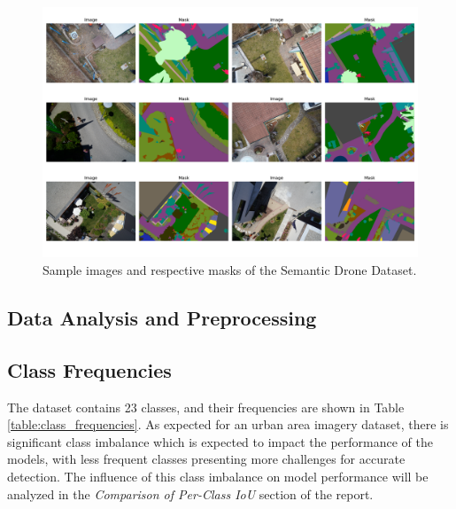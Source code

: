 \documentclass[a4paper]{article}
\begin{document}
\begin{figure}
    \centering
    \includegraphics[width=\linewidth]{images/collection_1.png}
    \caption{Sample images and respective masks of the Semantic Drone Dataset.}
    \label{fig:collection_1}
\end{figure}

\subsection{Data Analysis and Preprocessing}
\subsection{Class Frequencies}
The dataset contains 23 classes, and their frequencies are shown in Table \ref{table:class_frequencies}. As expected for an urban area imagery dataset, there is significant class imbalance which is expected to impact the performance of the models, with less frequent classes presenting more challenges for accurate detection. The influence of this class imbalance on model performance will be analyzed in the \textit{Comparison of Per-Class IoU} section of the report.
\end{document}
